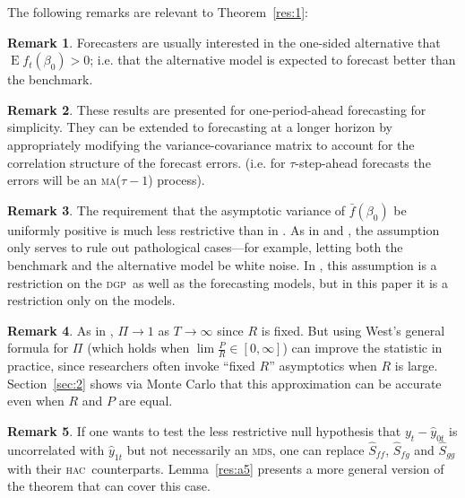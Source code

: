 \documentclass[11pt,fleqn]{article}
\theoremstyle{definition}
\newtheorem{rem}{Remark}
\DeclareMathOperator{\E}{E}
\newcommand{\dgp}{\textsc{dgp}}
\newcommand{\hac}{\textsc{hac}}
\newcommand{\ma}{\textsc{ma}}
\newcommand{\mds}{\textsc{mds}}
\begin{document}
The following remarks are relevant to Theorem~\ref{res:1}:

\begin{rem}
  Forecasters are usually interested in the one-sided alternative that
  $\E f_t(\beta_0) > 0$; i.e. that the alternative model is expected
  to forecast better than the benchmark.
\end{rem}

\begin{rem}
  These results are presented for one-period-ahead forecasting for
  simplicity.  They can be extended to forecasting at a longer horizon
  by appropriately modifying the variance-covariance matrix to account
  for the correlation structure of the forecast errors. (i.e. for
  $\tau$-step-ahead forecasts the errors will be an \ma($\tau-1$) process).
\end{rem}

\begin{rem}
  The requirement that the asymptotic variance of $\bar f(\beta_0)$ be
  uniformly positive is much less restrictive than in \cite{Wes:96}.
  As in \cite{GiW:06} and \citet{ClW:06,ClW:07}, the assumption only
  serves to rule out pathological cases---for example, letting both
  the benchmark and the alternative model be white noise. In
  \citet{Wes:96}, this assumption is a restriction on the \dgp\ as
  well as the forecasting models, but in this paper it is a
  restriction only on the models.
\end{rem}

\begin{rem}
  As in \citet{Wes:96}, $\Pi \to 1$ as $T \to \infty$ since $R$ is
  fixed.  But using West's general formula for $\Pi$ (which holds when
  $\lim \tfrac{P}{R} \in [0,\infty]$) can improve the statistic in practice,
  since researchers often invoke ``fixed $R$'' asymptotics when $R$ is
  large.  Section~\ref{sec:2} shows via Monte Carlo that this
  approximation can be accurate even when $R$ and $P$ are equal.
\end{rem}

\begin{rem}
  If one wants to test the less restrictive null hypothesis that
  $y_{t} - \hat{y}_{0t}$ is uncorrelated with $\hat{y}_{1t}$ but not
  necessarily an \mds, one can replace $\hat{S}_{ff}$, $\hat{S}_{fg}$
  and $\hat{S}_{gg}$ with their \hac\ counterparts.
  Lemma~\ref{res:a5} presents a more general version of the theorem
  that can cover this case.
\end{rem}
\end{document}
